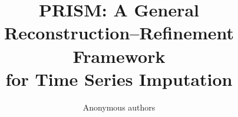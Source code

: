 \documentclass[10pt,twocolumn,letterpaper]{article}
\title{PRISM: A General Reconstruction--Refinement Framework\\for Time Series Imputation}
\author{Anonymous authors}
\begin{document}
\maketitle





\FloatBarrier
{\small}
\end{document}
